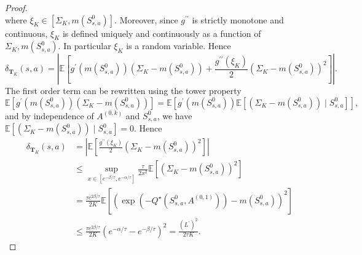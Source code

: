 \documentclass[11pt]{article}
\numberwithin{equation}{section}
\theoremstyle{definition}
\theoremstyle{remark}
\begin{document}
\begin{proof}
\[    \]
    where $\xi_K \in [\Sigma_K , m(S^0_{s,a})]$. Moreover, since $g^{\prime \prime}$ is strictly monotone and continuous, $\xi_K$ is defined uniquely and continuously as a function of $\Sigma_K , m(S^0_{s,a})$. In particular $\xi_K$ is a random variable. Hence
    \[
        \delta_{\mathbf T_K}(s,a) = \left| \mathbb E \left[ g^\prime(m(S^0_{s,a})) (\Sigma_K - m(S^0_{s,a})) + \frac{g^{\prime \prime}(\xi_K)}{2} (\Sigma_K - m(S^0_{s,a}))^2 \right] \right|.
    \]
    The first order term can be rewritten using the tower property
    \[
    \mathbb E \left[ g^\prime(m(S^0_{s,a})) (\Sigma_K - m(S^0_{s,a})) \right] = \mathbb E \left[g^\prime(m(S_{s,a}^0))\mathbb E \left[ (\Sigma_K - m(S^0_{s,a})) \mid S_{s,a}^0\right]\right],
    \]
    and by independence of $A^{(0,k)}$ and $S^0_{s,a}$, we have $\mathbb E \left[ (\Sigma_K - m(S^0_{s,a})) \mid S_{s,a}^0\right] = 0$.
    Hence
    \[
    \begin{aligned}
        \delta_{\mathbf T_K} (s,a) &= \left| \mathbb E \left[ \frac{g^{\prime \prime}(\xi_K)}{2} (\Sigma_K - m(S^0_{s,a}))^2 \right] \right| \\ 
        &\leq \sup_{x \in [e^{-\beta / \tau}, e^{-\alpha / \tau}]} \frac{\tau}{2 x^2} \mathbb E\left[ \left( \Sigma_K - m(S^0_{s,a}) \right)^2 \right]  \\
        &= \frac{\tau e^{2\beta / \tau}}{2K} \mathbb E \left[ \left(\exp( - Q^\star (S^0_{s,a}, A^{(0,1)})) - m(S_{s,a}^0)\right)^2 \right] \\
        & \leq \frac{\tau e^{2 \beta / \tau}}{2K} \left(e^{-\alpha / \tau} - e^{-\beta / \tau}\right)^2 = \frac{(L^\prime)^2}{2\tau K}.
    \end{aligned}
    \]
\end{proof}
\end{document}
